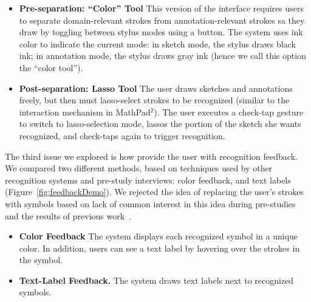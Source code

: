 \documentclass{egpubl}
\begin{document}
\begin{itemize}
\item \textbf{Pre-separation: ``Color'' Tool} This version of the
  interface requires users to separate domain-relevant strokes from
  annotation-relevant strokes sa they draw by toggling between stylus
  modes using a button.  The system uses ink color to indicate the
  current mode: in sketch mode, the stylus draws black ink; in
  annotation mode, the stylus draws gray ink (hence we call this
  option the ``color tool'').
\item \textbf{Post-separation: Lasso Tool} The user draws sketches and
  annotations freely, but then must lasso-select strokes to be
  recognized (similar to the interaction mechanism in
  MathPad$^{2}$\cite{1015741}).  The user executes a check-tap gesture
  to switch to lasso-selection mode, lassos the portion of the sketch
  she wants recognized, and check-taps again to trigger recognition.  
\end{itemize}

The third issue we explored is how provide the user with recognition
feedback.  We compared two different methods, based on techniques
used by other recognition systems and pre-study interviews: color feedback, 
and text labels (Figure~\ref{fig:feedbackDemo}).  We rejected the idea of
replacing the user's strokes with symbols based on lack of common
interest in this idea during pre-studies and the results of previous
work~\cite{Hong2002Sketch}.

\begin{itemize}
\item \textbf{Color Feedback} The system displays each recognized
symbol in a unique color.  In addition, users can see a text label by
hovering over the strokes in the symbol.  
\item \textbf{Text-Label Feedback.}  The system draws text labels next
to recognized symbols.
\end{itemize}



\end{document}

